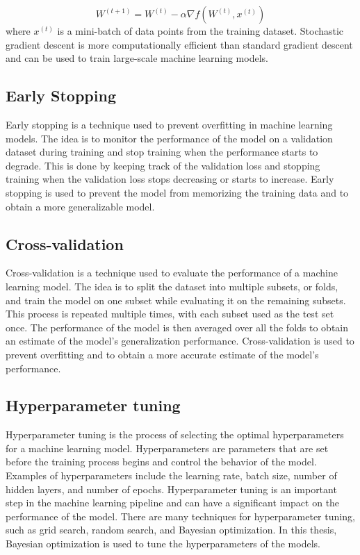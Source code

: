 $$
    W^{(t+1)} = W^{(t)} - \alpha \nabla f(W^{(t)}, x^{(t)})
$$
where $x^{(t)}$ is a mini-batch of data points from the training dataset. Stochastic gradient descent is more computationally efficient than standard gradient descent and can be used to train large-scale machine learning models.

\subsection{Early Stopping}
Early stopping is a technique used to prevent overfitting in machine learning models. The idea is to monitor the performance of the model on a validation dataset during training and stop training when the performance starts to degrade. This is done by keeping track of the validation loss and stopping training when the validation loss stops decreasing or starts to increase. Early stopping is used to prevent the model from memorizing the training data and to obtain a more generalizable model. 

\subsection{Cross-validation}
Cross-validation is a technique used to evaluate the performance of a machine learning model. The idea is to split the dataset into multiple subsets, or folds, and train the model on one subset while evaluating it on the remaining subsets. This process is repeated multiple times, with each subset used as the test set once. The performance of the model is then averaged over all the folds to obtain an estimate of the model's generalization performance. Cross-validation is used to prevent overfitting and to obtain a more accurate estimate of the model's performance.

\subsection{Hyperparameter tuning}
Hyperparameter tuning is the process of selecting the optimal hyperparameters for a machine learning model. Hyperparameters are parameters that are set before the training process begins and control the behavior of the model. Examples of hyperparameters include the learning rate, batch size, number of hidden layers, and number of epochs. Hyperparameter tuning is an important step in the machine learning pipeline and can have a significant impact on the performance of the model. There are many techniques for hyperparameter tuning, such as grid search, random search, and Bayesian optimization. In this thesis, Bayesian optimization is used to tune the hyperparameters of the models.

